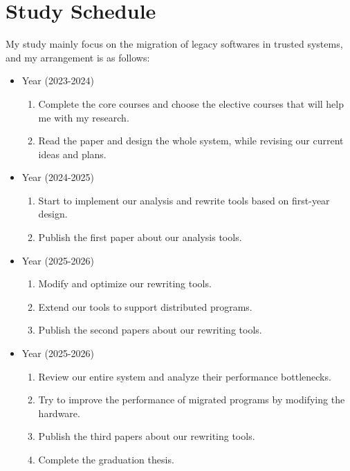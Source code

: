 \section{Study Schedule}
My study mainly focus on the migration of legacy softwares in trusted systems,
and my arrangement is as follows:

\begin{itemize}
    \item {} Year (2023-2024)
    \begin{enumerate}
        \item Complete the core courses and choose the elective courses
        that will help me with my research. 
        \item Read the paper and design the whole system, while revising
        our current ideas and plans.
    \end{enumerate}
    \item {} Year (2024-2025)
        \begin{enumerate}
            \item Start to implement our analysis and rewrite tools based on
            first-year design.
            \item Publish the first paper about our analysis tools.
        \end{enumerate}
    \item {} Year (2025-2026)
        \begin{enumerate}
            \item Modify and optimize our rewriting tools.
            \item Extend our tools to support distributed programs.
            \item Publish the second papers about our rewriting tools.
        \end{enumerate}
    \item {} Year (2025-2026)
        \begin{enumerate}
            \item Review our entire system and analyze their performance bottlenecks.
            \item Try to improve the performance of migrated programs by
            modifying the hardware.
            \item Publish the third papers about our rewriting tools.
            \item Complete the graduation thesis. 
        \end{enumerate}
\end{itemize}

